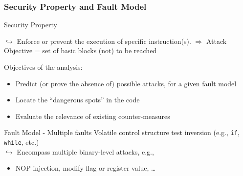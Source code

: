 
\begin{frame} \frametitle{Security Property and Fault Model}
\vfill
\begin{block}{Security Property}
\begin{center}
$\hookrightarrow$ \alert{Enforce} or \alert{prevent} the execution of specific instruction(s).
\alert{$\Rightarrow$ Attack Objective = set of basic blocks (not) to be reached} 
\end{center}
\end{block}
\vfill
\begin{block}
{Objectives of the analysis:} 
\begin{itemize}
\item \alert{Predict} (or \alert{prove the absence of}) possible attacks,
		for a given fault model
\item \alert{Locate} the ``dangerous spots'' in the code 
\item \alert{Evaluate} the relevance of existing counter-measures 
\end{itemize}
\end{block}
\vfill
\begin{block}{Fault Model - Multiple faults}
Volatile control structure \alert{test inversion} (e.g., {\tt if}, {\tt while}, etc.) \\
$\hookrightarrow$ Encompass multiple binary-level attacks, e.g.,
\begin{itemize} 
\item NOP injection, modify flag or register value, \dots
\end{itemize} 
\end{block}
\vfill
\end{frame}







